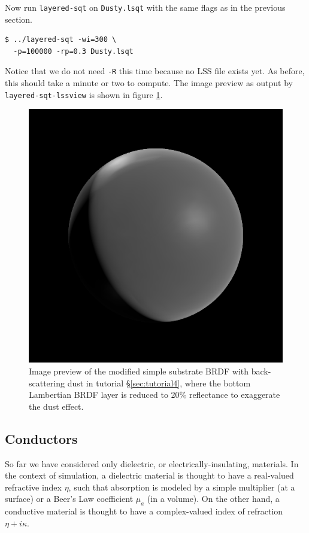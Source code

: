 \documentclass[
    twoside,
    twocolumn,
    letterpaper,
    10pt]{article}
\begin{document}
Now run \texttt{layered-sqt} on \texttt{Dusty.lsqt} with the same flags as in
the previous section.
\begin{verbatim}
$ ../layered-sqt -wi=300 \
  -p=100000 -rp=0.3 Dusty.lsqt
\end{verbatim}
Notice that we do not need \texttt{-R} this time because no LSS file 
exists yet. As before, this should take a minute or two to compute.
The image preview as output by \texttt{layered-sqt-lssview} is shown in
figure \ref{fig:tutorial4}.

\begin{figure}
\begin{center}
    \includegraphics[width=0.75\columnwidth]{tutorial4.png}
    \caption{Image preview of the modified simple substrate BRDF with 
    back-scattering
    dust in tutorial \S\ref{sec:tutorial4}, where the bottom Lambertian BRDF 
    layer is reduced to 20\% reflectance to exaggerate the dust effect.
    \label{fig:tutorial4}}
\end{center}
\end{figure}

\subsection{Conductors}
\label{sec:tutorial5}
So far we have considered only dielectric, or electrically-insulating, 
materials. In the context of simulation, a dielectric material is 
thought to have a real-valued refractive index $\eta$, such that 
absorption is modeled by a simple multiplier
(at a surface) or a Beer's Law coefficient $\mu_a$ (in a volume). 
On the other hand, a conductive material is thought to have a complex-valued
index of refraction $\eta + i\kappa$.
\end{document}
